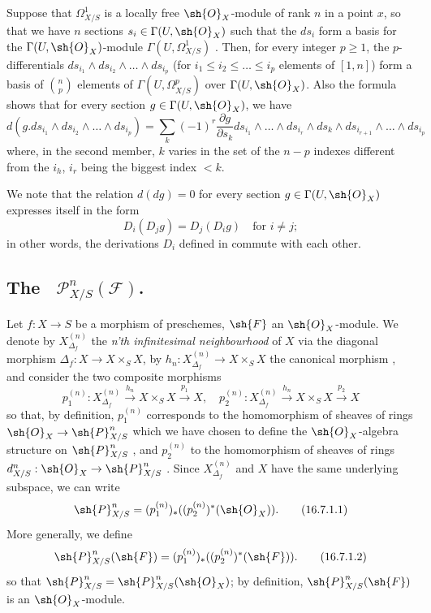 \begin{env}[16.6.5]
\label{IV.16.6.5}
Suppose that $\Omega_{X/S}^1$ is a locally free $\sh{O}_X$-module of rank $n$ in a point $x$, so that we have $n$ sections $s_i \in \Gamma(U, \sh{O}_X)$ such that the $ds_i$ form a basis for the $\Gamma(U, \sh{O}_X)$-module $\Gamma(U, \Omega_{X/S}^1)$ .
Then, for every integer $p \geq 1$, the $p$-differentials $ds_{i_1} \wedge ds_{i_2} \wedge \dots \wedge ds_{i_p}$ (for $i_1 \leq i_2 \leq \dots \leq i_p$ elements of $[1,n]$) form a basis of $\binom{n}{p}$ elements of $\Gamma(U, \Omega_{X/S}^p)$ over $\Gamma(U, \sh{O}_X)$.
Also the formula  shows that for every section $g \in \Gamma(U, \sh{O}_X)$, we have
\[
  \label{IV.16.6.5.1}
  d(g.ds_{i_1} \wedge ds_{i_2} \wedge \dots \wedge ds_{i_p}) = \sum_k (-1)^r \frac{\partial g}{\partial s_k} ds_{i_1} \wedge \dots \wedge ds_{i_r} \wedge ds_k \wedge ds_{i_{r+1}} \wedge \dots \wedge ds_{i_p}
  \tag{16.6.5.1}
\]
where, in the second member, $k$ varies in the set of the $n - p$ indexes different from the $i_h$, $i_r$ being the biggest index $<k$.

We note that the relation $d(dg) = 0$ for every section $g \in \Gamma(U, \sh{O}_X)$ expresses itself in the form
\[
  D_i(D_j g) = D_j(D_i g) \quad \text{for $i \neq j$};
\]
in other words, the derivations $D_i$ defined in  commute with each other.
\end{env}

\subsection{The ~$\mathcal{P}_{X/S}^n(\mathcal{F})$.}
\label{IV.16.7}

\begin{env}[16.7.1]
\label{IV.16.7.1}
Let $f:X \to S$ be a morphism of preschemes, $\sh{F}$ an $\sh{O}_X$-module.
We denote by $X_{\Delta_f}^{(n)}$ the \emph{n'th infinitesimal neighbourhood} of $X$ via the diagonal morphism
$\Delta_f: X \to X \times_S X$, by $h_n:X_{\Delta_f}^{(n)} \to X \times_S X$ the canonical morphism , and consider the two composite morphisms
\[
  p_1^{(n)}:X_{\Delta_f}^{(n)} \xrightarrow{h_n} X \times_S X \xrightarrow{p_1} X, \quad 
  p_2^{(n)}:X_{\Delta_f}^{(n)} \xrightarrow{h_n} X \times_S X \xrightarrow{p_2} X
\]
so that, by definition, $p_1^{(n)}$ corresponds to the homomorphism of sheaves of rings $\sh{O}_X \to \sh{P}_{X/S}^n$ which we have chosen to define the $\sh{O}_X$-algebra structure on $\sh{P}_{X/S}^n$ , and $p_2^{(n)}$ to the homomorphism of sheaves of rings $d^n_{X/S}:\sh{O}_X \to \sh{P}_{X/S}^n$ .
Since $X_{\Delta_f}^{(n)}$ and $X$ have the same underlying subspace, we can write
\[
  \label{IV.16.7.1.1}
  \sh{P}_{X/S}^n = (p_1^{(n)})_* ((p_2^{(n)})^* (\sh{O}_X)).
  \tag{16.7.1.1}
\]
More generally, we define
\[
  \label{IV.16.7.1.2}
  \sh{P}_{X/S}^n(\sh{F}) = (p_1^{(n)})_* ((p_2^{(n)})^* (\sh{F})).
  \tag{16.7.1.2}
\]
so that $\sh{P}_{X/S}^n = \sh{P}_{X/S}^n(\sh{O}_X)$;
by definition, $\sh{P}_{X/S}^n(\sh{F})$ is an $\sh{O}_X$-module.
\end{env}

